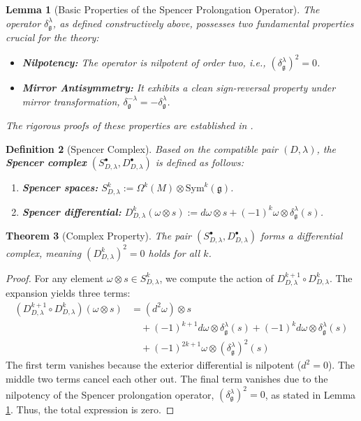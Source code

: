 \documentclass[a4paper,12pt]{extarticle}
\theoremstyle{plain}
\newtheorem{theorem}{Theorem}[section]
\newtheorem{lemma}[theorem]{Lemma}
\newtheorem{definition}[theorem]{Definition}
\theoremstyle{definition}
\begin{document}
\begin{lemma}[Basic Properties of the Spencer Prolongation Operator]
\label{lem:spencer-properties}
The operator $\delta^\lambda_\mathfrak{g}$, as defined constructively above, possesses two fundamental properties crucial for the theory:
\begin{itemize}
    \item \textbf{Nilpotency:} The operator is nilpotent of order two, i.e., $(\delta^\lambda_\mathfrak{g})^2 = 0$.
    \item \textbf{Mirror Antisymmetry:} It exhibits a clean sign-reversal property under mirror transformation, $\delta^{-\lambda}_\mathfrak{g} = -\delta^\lambda_\mathfrak{g}$.
\end{itemize}
The rigorous proofs of these properties are established in \cite{zheng2025geometric, zheng2025constructing}.
\end{lemma}

\begin{definition}[Spencer Complex]
\label{def:spencer-complex-main}
Based on the compatible pair $(D,\lambda)$, the \textbf{Spencer complex} $(S^\bullet_{D,\lambda}, D^\bullet_{D,\lambda})$ is defined as follows:
\begin{enumerate}
\item \textbf{Spencer spaces:} $S^k_{D,\lambda} := \Omega^k(M) \otimes \mathrm{Sym}^k(\mathfrak{g})$.
\item \textbf{Spencer differential:} $D^k_{D,\lambda}(\omega \otimes s) := d\omega \otimes s + (-1)^k \omega \otimes \delta^\lambda_\mathfrak{g}(s)$.
\end{enumerate}
\end{definition}

\begin{theorem}[Complex Property]
\label{thm:is-a-complex}
The pair $(S^\bullet_{D,\lambda}, D^\bullet_{D,\lambda})$ forms a differential complex, meaning $(D^k_{D,\lambda})^2 = 0$ holds for all $k$.
\end{theorem}
\begin{proof}
For any element $\omega \otimes s \in S^k_{D,\lambda}$, we compute the action of $D^{k+1}_{D,\lambda} \circ D^k_{D,\lambda}$. The expansion yields three terms:
\begin{align*}
(D^{k+1}_{D,\lambda} \circ D^k_{D,\lambda})(\omega \otimes s) &= (d^2\omega) \otimes s \\
&\quad + (-1)^{k+1} d\omega \otimes \delta^\lambda_\mathfrak{g}(s) + (-1)^k d\omega \otimes \delta^\lambda_\mathfrak{g}(s) \\
&\quad + (-1)^{2k+1} \omega \otimes (\delta^\lambda_\mathfrak{g})^2(s)
\end{align*}
The first term vanishes because the exterior differential is nilpotent ($d^2=0$). The middle two terms cancel each other out. The final term vanishes due to the nilpotency of the Spencer prolongation operator, $(\delta^\lambda_\mathfrak{g})^2 = 0$, as stated in Lemma \ref{lem:spencer-properties}. Thus, the total expression is zero.
\end{proof}
\end{document}
